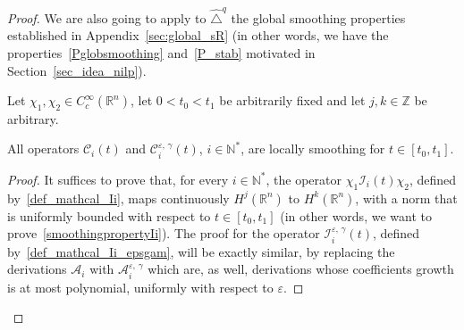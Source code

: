 \documentclass[AHL,Unicode,published]{cedram}
\newcommand*\R{\mathbb{R}}
\newcommand*\N{\mathbb{N}}
\newcommand*\Z{\mathbb{Z}}
\newcommand{\calA}{\mathcal{A}}
\newcommand{\calC}{\mathcal{C}}
\newcommand{\calI}{\mathcal{I}}
\begin{document}
\begin{proof}
We are also going to apply to $\widehat{\triangle}^{q}$ the global smoothing properties established in Appendix~\ref{sec:global_sR} (in other words, we have the properties~\eqref{Pglobsmoothing} and~\eqref{P_stab} motivated in Section~\ref{sec_idea_nilp}).


Let $\chi_1,\chi_2\in C_c^\infty(\R^n)$, let $0<t_0<t_1$ be arbitrarily fixed and let $j,k\in\Z$ be arbitrary.

\begin{lemm}\label{lem_Ci_locsmoothing}
All operators $\calC_i(t)$ and $\calC_i^{\varepsilon,\,\gamma}(t)$, $i\in\N^*$, are locally smoothing for $t\in[t_0,t_1]$.
\end{lemm}

\goodbreak

\begin{proof}
It suffices to prove that, for every $i\in\N^*$, the operator $\chi_1\calI_i(t)\chi_2$, defined by~\eqref{def_mathcal_Ii}, maps continuously $H^j(\R^n)$ to $H^{k}(\R^n)$, with a norm that is uniformly bounded with respect to $t\in[t_0,t_1]$ (in other words, we want to prove~\eqref{smoothingpropertyIi}). The proof for the operator $\calI_i^{\varepsilon,\,\gamma}(t)$, defined by~\eqref{def_mathcal_Ii_epsgam}, will be exactly similar, by replacing the derivations $\calA_i$ with $\calA_i^{\varepsilon,\,\gamma}$ which are, as well, derivations whose coefficients growth is at most polynomial, uniformly with respect to $\varepsilon$.


\end{proof}
\end{proof}
\end{document}
